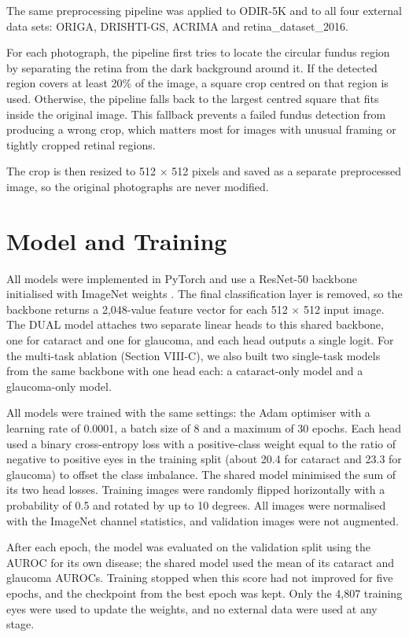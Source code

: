 \documentclass[conference,a4paper]{IEEEtran}
\begin{document}
The same preprocessing pipeline was applied to ODIR-5K and to all four external data sets: ORIGA,
DRISHTI-GS, ACRIMA and retina\_dataset\_2016.

For each photograph, the pipeline first tries to locate the circular fundus region by separating the
retina from the dark background around it. If the detected region covers at least 20\% of the image,
a square crop centred on that region is used. Otherwise, the pipeline falls back to the largest
centred square that fits inside the original image. This fallback prevents a failed fundus detection
from producing a wrong crop, which matters most for images with unusual framing or tightly cropped
retinal regions.

The crop is then resized to 512 \(\times\) 512 pixels and saved as a separate preprocessed image, so
the original photographs are never modified.

\section{Model and Training}

All models were implemented in PyTorch and use a ResNet-50 backbone \cite{ref25} initialised with ImageNet weights \cite{ref26}. The
final classification layer is removed, so the backbone returns a 2,048-value feature vector for each
512 \(\times\) 512 input image. The DUAL model attaches two separate linear heads to this shared
backbone, one for cataract and one for glaucoma, and each head outputs a single logit. For the
multi-task ablation (Section VIII-C), we also built two single-task models from the same backbone
with one head each: a cataract-only model and a glaucoma-only model.

All models were trained with the same settings: the Adam optimiser \cite{ref27} with a learning rate
of 0.0001, a batch size of 8 and a maximum of 30 epochs. Each head used a binary cross-entropy loss
with a positive-class weight equal to the ratio of negative to positive eyes in the training split
(about 20.4 for cataract and 23.3 for glaucoma) to offset the class imbalance. The shared model
minimised the sum of its two head losses. Training images were randomly flipped horizontally with a
probability of 0.5 and rotated by up to 10 degrees. All images were normalised with the ImageNet
channel statistics, and validation images were not augmented.

After each epoch, the model was evaluated on the validation split using the AUROC for its own
disease; the shared model used the mean of its cataract and glaucoma AUROCs. Training stopped when
this score had not improved for five epochs, and the checkpoint from the best epoch was kept. Only
the 4,807 training eyes were used to update the weights, and no external data were used at any
stage.
\end{document}

